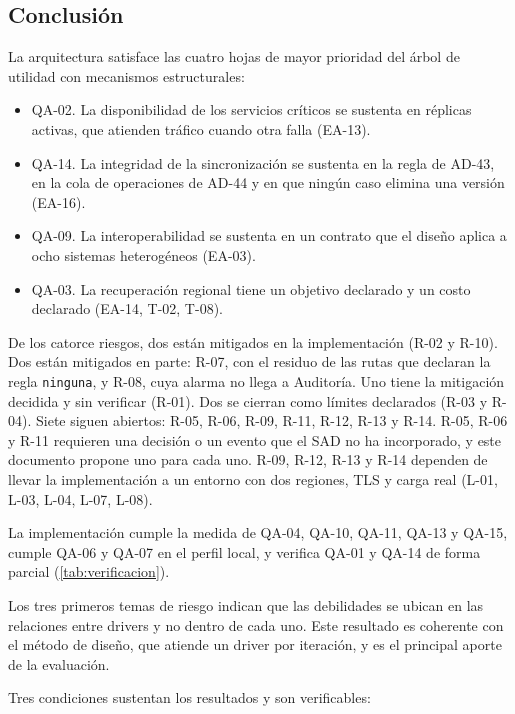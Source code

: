 \documentclass[11pt,letterpaper]{article}
\begin{document}
\subsection{Conclusión}
\label{sec:conclusion}

La arquitectura satisface las cuatro hojas de mayor prioridad del árbol de utilidad con mecanismos
estructurales:

\begin{itemize}
  \item QA-02. La disponibilidad de los servicios críticos se sustenta en réplicas activas, que
        atienden tráfico cuando otra falla (EA-13).
  \item QA-14. La integridad de la sincronización se sustenta en la regla de AD-43, en la cola de
        operaciones de AD-44 y en que ningún caso elimina una versión (EA-16).
  \item QA-09. La interoperabilidad se sustenta en un contrato que el diseño aplica a ocho sistemas
        heterogéneos (EA-03).
  \item QA-03. La recuperación regional tiene un objetivo declarado y un costo declarado (EA-14,
        T-02, T-08).
\end{itemize}

De los catorce riesgos, dos están mitigados en la implementación (R-02 y R-10). Dos
están mitigados en parte: R-07, con el residuo de las rutas que declaran la regla
\texttt{ninguna}, y R-08, cuya alarma no llega a Auditoría. Uno tiene la mitigación decidida y sin
verificar (R-01). Dos se cierran como límites declarados (R-03 y R-04). Siete siguen abiertos: R-05,
R-06, R-09, R-11, R-12, R-13 y R-14. R-05, R-06 y R-11 requieren una decisión o un evento que el
SAD no ha incorporado, y este documento propone uno para cada uno. R-09, R-12, R-13 y R-14 dependen
de llevar la implementación a un entorno con dos regiones, TLS y carga real (L-01, L-03, L-04,
L-07, L-08).

La implementación cumple la medida de QA-04, QA-10, QA-11, QA-13 y QA-15, cumple QA-06 y QA-07 en el
perfil local, y verifica QA-01 y QA-14 de forma parcial (\cref{tab:verificacion}).

Los tres primeros temas de riesgo indican que las debilidades se ubican en las relaciones entre
drivers y no dentro de cada uno. Este resultado es coherente con el método de diseño, que atiende un driver por
iteración, y es el principal aporte de la evaluación.

Tres condiciones sustentan los resultados y son verificables:
\end{document}

